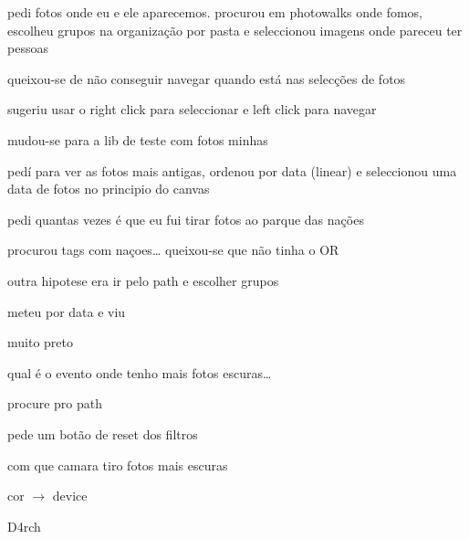\begin{myitemize}
	\item pedi fotos onde eu e ele aparecemos. procurou em photowalks onde fomos, escolheu grupos na organização por pasta e seleccionou imagens onde pareceu ter pessoas

	\item queixou-se de não conseguir navegar quando está nas selecções de fotos

	\item sugeriu usar o right click para seleccionar e left click para navegar


	\item mudou-se para a lib de teste com fotos minhas

	\item pedí para ver as fotos mais antigas, ordenou por data (linear) e seleccionou uma data de fotos no principio do canvas


	\item pedi quantas vezes é que eu fui tirar fotos ao parque das nações

	\item procurou tags com naçoes… queixou-se que não tinha o OR 

	\item outra hipotese era ir pelo path e escolher grupos

	\item meteu por data e viu


	\item muito preto


	\item qual é o evento onde tenho mais fotos escuras…

	\item procure pro path


	\item pede um botão de reset dos filtros


	\item com que camara tiro fotos mais escuras

	\item cor $\rightarrow$ device

\end{myitemize}



D4rch

